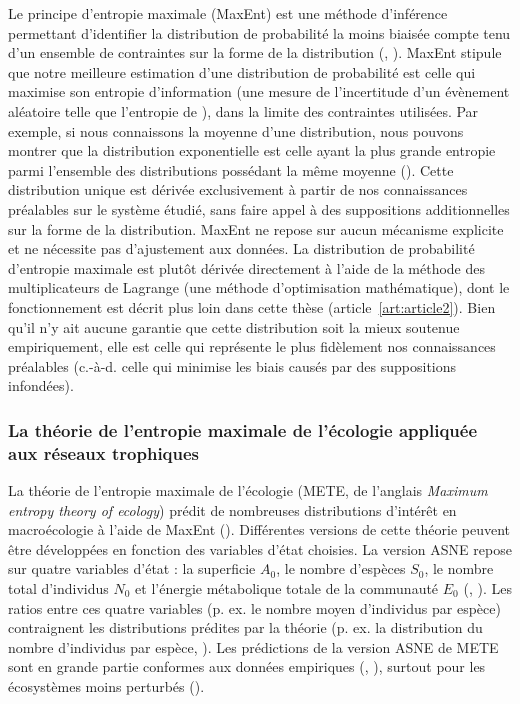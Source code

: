 Le principe d'entropie maximale (MaxEnt) est une méthode d'inférence permettant
d'identifier la distribution de probabilité la moins biaisée compte tenu d'un
ensemble de contraintes sur la forme de la distribution
(\cite{Jaynes1957Informationa}, \cite{Jaynes1957Information}). MaxEnt stipule
que notre meilleure estimation d'une distribution de probabilité est celle qui
maximise son entropie d'information (une mesure de l'incertitude d'un évènement
aléatoire telle que l'entropie de \cite{Shannon1948Mathematical}), dans
la limite des contraintes utilisées. Par exemple, si nous connaissons la moyenne
d'une distribution, nous pouvons montrer que la distribution exponentielle est
celle ayant la plus grande entropie parmi l'ensemble des distributions possédant
la même moyenne (\cite{Frank2011Simple}). Cette distribution unique est dérivée
exclusivement à partir de nos connaissances préalables sur le système étudié,
sans faire appel à des suppositions additionnelles sur la forme de la
distribution. MaxEnt ne repose sur aucun mécanisme explicite et ne nécessite pas
d'ajustement aux données. La distribution de probabilité d'entropie maximale est
plutôt dérivée directement à l'aide de la méthode des multiplicateurs de
Lagrange (une méthode d'optimisation mathématique), dont le fonctionnement est
décrit plus loin dans cette thèse (article~\ref{art:article2}). Bien qu'il n'y
ait aucune garantie que cette distribution soit la mieux soutenue empiriquement,
elle est celle qui représente le plus fidèlement nos connaissances préalables
(c.-à-d. celle qui minimise les biais causés par des suppositions infondées). 

\subsubsection{La théorie de l'entropie maximale de l'écologie appliquée aux réseaux trophiques} 

La théorie de l'entropie maximale de l'écologie (METE, de l'anglais
\textit{Maximum entropy theory of ecology}) prédit de nombreuses distributions
d'intérêt en macroécologie à l'aide de MaxEnt (\cite{Harte2011Maximum}).
Différentes versions de cette théorie peuvent être développées en fonction des
variables d'état choisies. La version ASNE repose sur quatre variables d'état :
la superficie $A_0$, le nombre d'espèces $S_0$, le nombre total d'individus
$N_0$ et l'énergie métabolique totale de la communauté $E_0$
(\cite{Harte2008Maximum}, \cite{Harte2014Maximum}). Les ratios entre ces quatre
variables (p. ex. le nombre moyen d'individus par espèce) contraignent les
distributions prédites par la théorie (p. ex. la distribution du nombre
d'individus par espèce, \cite{Brummer2019Derivations}). Les prédictions de la
version ASNE de METE sont en grande partie conformes aux données empiriques
(\cite{Harte2011Maximum}, \cite{McGlinn2015Exploring}), surtout pour les
écosystèmes moins perturbés (\cite{Newman2020Disturbance}). 

